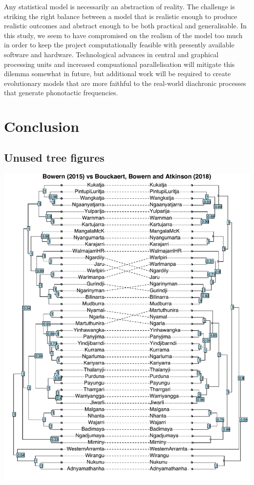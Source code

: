 \documentclass[]{article}
\begin{document}
Any statistical model is necessarily an abstraction of reality. The challenge is striking the right balance between a model that is realistic enough to produce realistic outcomes and abstract enough to be both practical and generalisable. In this study, we seem to have compromised on the realism of the model too much in order to keep the project computationally feasible with presently available software and hardware. Technological advances in central and graphical processing units and increased compuational parallelisation \autocite[e.g.][]{holbrook_massive_2020} will mitigate this dilemma somewhat in future, but additional work will be required to create evolutionary models that are more faithful to the real-world diachronic processes that generate phonotactic frequencies.

\hypertarget{conclusion}{%
\section{Conclusion}\label{conclusion}}

\newpage

\hypertarget{unused-tree-figures}{%
\subsection{Unused tree figures}\label{unused-tree-figures}}

\includegraphics{fig/cb2015_vs_bba2018.pdf}
\end{document}
